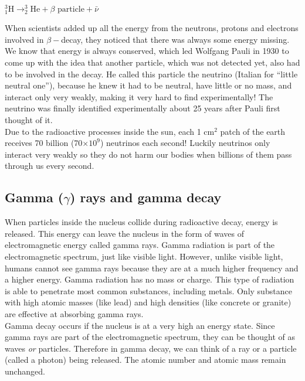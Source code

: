 \begin{center}
$^{3}_{1}\text{H} \rightarrow ^{3}_{2}\text{He} + \beta \text{ particle} + \bar{\nu}$
\end{center}

\begin{IFact}{
When scientists added up all the energy from the neutrons, protons and electrons involved in $\beta -$decay, they noticed that there was always some energy missing. We know that energy is always conserved, which led Wolfgang Pauli in 1930 to come up with the idea that another particle, which was not detected yet, also had to be involved in the decay. He called this particle the neutrino (Italian for ``little neutral one''), because he knew it had to be neutral, have little or no mass, and interact only very weakly, making it very hard to find experimentally! The neutrino was finally identified experimentally about 25 years after Pauli first thought of it.\\

Due to the radioactive processes inside the sun, each 1 $\text{cm}^{2}$ patch of the earth receives 70 billion (70$\times 10^{9}$) neutrinos each second! Luckily neutrinos only interact very weakly so they do not harm our bodies when billions of them pass through us every second.
}
\end{IFact}
\subsection{Gamma ($\gamma$) rays and gamma decay}

When particles inside the nucleus collide during radioactive decay, energy is released. This energy can leave the nucleus in the form of waves of electromagnetic energy called gamma rays. Gamma radiation is part of the electromagnetic spectrum, just like visible light. However, unlike visible light, humans cannot see gamma rays because they are at a much higher frequency and a higher energy. Gamma radiation has no mass or charge. This type of radiation is able to penetrate most common substances, including metals. Only substance with high atomic masses (like lead) and high densities (like concrete or granite) are effective at absorbing gamma rays.\\

Gamma decay occurs if the nucleus is at a very high an energy state. Since gamma rays are part of the electromagnetic spectrum, they can be thought of as waves \emph{or} particles. Therefore in gamma decay, we can think of a ray or a particle (called a photon) being released. The atomic number and atomic mass remain unchanged.

